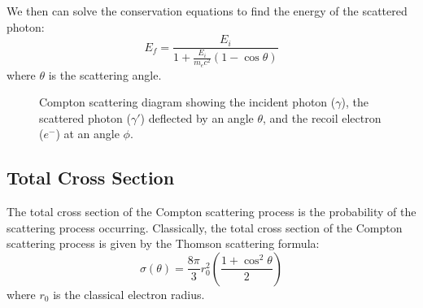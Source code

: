 We then can solve the conservation equations to find the energy of the scattered photon:
\begin{equation}
E_f = \frac{E_i}{1 + \frac{E_i}{m_e c^2}(1 - \cos\theta)}
\end{equation}
where $\theta$ is the scattering angle.
\begin{figure}[h]
    \centering
    \caption{Compton scattering diagram showing the incident photon ($\gamma$), the scattered photon ($\gamma'$) deflected by an angle $\theta$, and the recoil electron ($e^-$) at an angle $\phi$.}
    \label{fig:scattering}
    \end{figure}

\subsection{Total Cross Section}
The total cross section of the Compton scattering process is the probability of the scattering process occurring. Classically, the total cross section of the Compton scattering process is given by the Thomson scattering formula:
\begin{equation}
\sigma(\theta) = \frac{8\pi}{3} r_0^2 \left( \frac{1 + \cos^2\theta}{2} \right)
\end{equation}
where $r_0$ is the classical electron radius.

